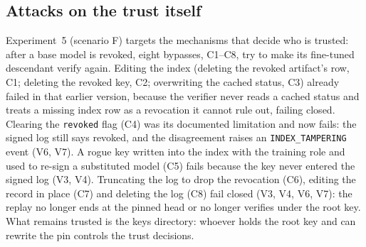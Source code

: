\documentclass[conference]{IEEEtran}
\begin{document}
\subsection{Attacks on the trust itself}
Experiment~5 (scenario F) targets the mechanisms that decide who is trusted: after a base model is revoked, eight bypasses, C1--C8, try to make its fine-tuned descendant verify again. Editing the index (deleting the revoked artifact's row, C1; deleting the revoked key, C2; overwriting the cached status, C3) already failed in that earlier version, because the verifier never reads a cached status and treats a missing index row as a revocation it cannot rule out, failing closed. Clearing the \texttt{revoked} flag (C4) was its documented limitation and now fails: the signed log still says revoked, and the disagreement raises an \texttt{INDEX\_TAMPERING} event (V6, V7). A rogue key written into the index with the training role and used to re-sign a substituted model (C5) fails because the key never entered the signed log (V3, V4). Truncating the log to drop the revocation (C6), editing the record in place (C7) and deleting the log (C8) fail closed (V3, V4, V6, V7): the replay no longer ends at the pinned head or no longer verifies under the root key. What remains trusted is the keys directory: whoever holds the root key and can rewrite the pin controls the trust decisions.
\end{document}
